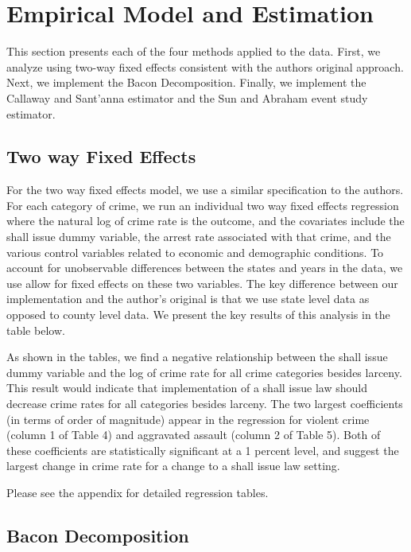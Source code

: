 \documentclass{article}
\begin{document}
\section{Empirical Model and Estimation}

This section presents each of the four methods applied to the data. First, we analyze using two-way fixed effects consistent with the authors original approach. Next, we implement the Bacon Decomposition. Finally, we implement the Callaway and Sant'anna estimator  and the Sun and Abraham event study estimator.

\subsection{Two way Fixed Effects}

For the two way fixed effects model, we use a similar specification to the authors. For each category of crime, we run an individual two way fixed effects regression where the natural log of crime rate is the outcome, and the covariates include the shall issue dummy variable, the arrest rate associated with that crime, and the various control variables related to economic and demographic conditions. To account for unobservable differences between the states and years in the data, we use allow for fixed effects on these two variables. The key difference between our implementation and the author's original is that we use state level data as opposed to county level data. We present the key results of this analysis in the table below.



As shown in the tables, we find a negative relationship between the shall issue dummy variable and the log of crime rate for all crime categories besides larceny. This result would indicate that implementation of a shall issue law should decrease crime rates for all categories besides larceny. The two largest coefficients (in terms of order of magnitude) appear in the regression for violent crime (column 1 of Table 4) and aggravated assault (column 2 of Table 5). Both of these coefficients are statistically significant at a 1 percent level, and suggest the largest change in crime rate for a change to a shall issue law setting.

Please see the appendix for detailed regression tables.

\subsection{Bacon Decomposition}
\end{document}
